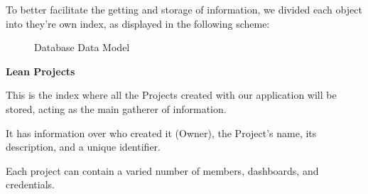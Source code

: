 \documentclass[a4paper,twoside,10pt]{report}
\begin{document}
To better facilitate the getting and storage of information, we divided each object into they're own index, as displayed in the following scheme:

\begin{figure}[h!]
    \center
    \caption{Database Data Model}
\end{figure}

\textbf{Lean Projects}

This is the index where all the Projects created with our application will be stored, acting as the main gatherer of information.

It has information over who created it (Owner), the Project's name, its description, and a unique identifier.

Each project can contain a varied number of members, dashboards, and credentials. 
\end{document}
